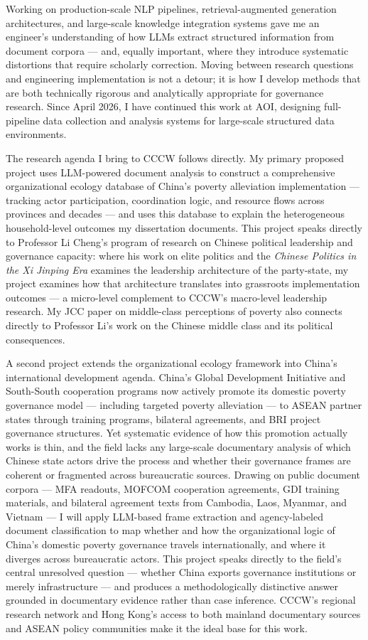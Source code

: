 \documentclass[11pt, letterpaper]{article}
\begin{document}
Working on production-scale NLP pipelines, retrieval-augmented generation
architectures, and large-scale knowledge integration systems gave me an engineer's
understanding of how LLMs extract structured information from document corpora ---
and, equally important, where they introduce systematic distortions that require
scholarly correction. Moving between research questions and engineering
implementation is not a detour; it is how I develop methods that are both
technically rigorous and analytically appropriate for governance research. Since
April 2026, I have continued this work at AOI, designing full-pipeline data
collection and analysis systems for large-scale structured data environments.

The research agenda I bring to CCCW follows directly. My primary proposed project
uses LLM-powered document analysis to construct a comprehensive organizational
ecology database of China's poverty alleviation implementation --- tracking actor
participation, coordination logic, and resource flows across provinces and decades
--- and uses this database to explain the heterogeneous household-level outcomes
my dissertation documents. This project speaks directly to Professor Li Cheng's
program of research on Chinese political leadership and governance capacity: where
his work on elite politics and the \textit{Chinese Politics in the Xi Jinping Era} examines
the leadership architecture of the party-state, my project examines how that
architecture translates into grassroots implementation outcomes --- a micro-level
complement to CCCW's macro-level leadership research. My JCC paper on middle-class perceptions of poverty also connects directly to
Professor Li's work on the Chinese middle class and its political consequences.

A second project extends the organizational ecology framework into China's
international development agenda. China's Global Development Initiative and
South-South cooperation programs now actively promote its domestic poverty
governance model --- including targeted poverty alleviation --- to ASEAN partner
states through training programs, bilateral agreements, and BRI project governance
structures. Yet systematic evidence of how this promotion actually works is thin,
and the field lacks any large-scale documentary analysis of which Chinese state
actors drive the process and whether their governance frames are coherent or
fragmented across bureaucratic sources. Drawing on public document corpora --- MFA
readouts, MOFCOM cooperation agreements, GDI training materials, and bilateral
agreement texts from Cambodia, Laos, Myanmar, and Vietnam --- I will apply
LLM-based frame extraction and agency-labeled document classification to map
whether and how the organizational logic of China's domestic poverty governance
travels internationally, and where it diverges across bureaucratic actors. This
project speaks directly to the field's central unresolved question --- whether China
exports governance institutions or merely infrastructure --- and produces a
methodologically distinctive answer grounded in documentary evidence rather than
case inference. CCCW's regional research network and Hong Kong's access to both
mainland documentary sources and ASEAN policy communities make it the ideal base
for this work.
\end{document}

